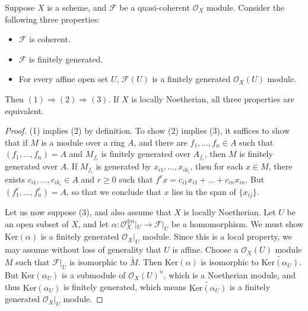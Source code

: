 \begin{lemma}
    Suppose $X$ is a scheme, and $\mathcal{F}$ be a quasi-coherent $\mathcal{O}_X$ module. Consider the following three properties:
    \begin{itemize}
        \item $\mathcal{F}$ is coherent.
        \item $\mathcal{F}$ is finitely generated.
        \item For every affine open set $U$, $\mathcal{F}(U)$ is a finitely generated $\mathcal{O}_X(U)$ module.
    \end{itemize}
    Then $(1) \Rightarrow (2) \Rightarrow (3)$. If $X$ is locally Noetherian, all three properties are equivalent.
\end{lemma}
\begin{proof}
    (1) implies (2) by definition. To show (2) implies (3), it suffices to show that if $M$ is a module over a ring $A$, and there are $f_1,\dots,f_n \in A$ such that $(f_1,\dots,f_n) = A$ and $M_{f_i}$ is finitely generated over $A_{f_i}$, then $M$ is finitely generated over $A$. If $M_{f_i}$ is generated by $x_{i1}, \dots, x_{ik_i}$, then for each $x \in M$, there exists $c_{i1},\dots,c_{ik_i} \in A$ and $r \geq 0$ such that $f^r x = c_{i1} x_{i1} + \dots + c_{in} x_{in}$. But $(f_1^r,\dots,f_n^r) = A$, so that we conclude that $x$ lies in the span of $\{ x_{ij} \}$.

    Let us now suppose (3), and also assume that $X$ is locally Noetherian. Let $U$ be an open subset of $X$, and let $\alpha: \mathcal{O}_X^{\oplus n}|_U \to \mathcal{F}|_U$ be a homomorphism. We must show $\text{Ker}(\alpha)$ is a finitely generated $\mathcal{O}_X|_U$ module. Since this is a local property, we may assume without loss of generality that $U$ is affine. Choose a $\mathcal{O}_X(U)$ module $M$ such that $\mathcal{F}|_U$ is isomorphic to $\widetilde{M}$. Then $\text{Ker}(\alpha)$ is isomorphic to $\widetilde{\text{Ker}(\alpha_U)}$. But $\text{Ker}(\alpha_U)$ is a submodule of $\mathcal{O}_X(U)^n$, which is a Noetherian module, and thus $\text{Ker}(\alpha_U)$ is finitely generated, which means $\widetilde{\text{Ker}(\alpha_U)}$ is a finitely generated $\mathcal{O}_X|_U$ module.
\end{proof}

